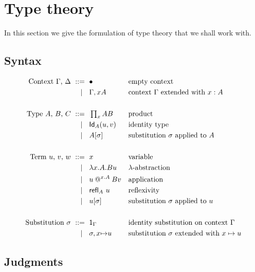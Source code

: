 \section{Type theory}
\label{sec:type-theory}

In this section we give the formulation of type theory that we shall work with.

\subsection{Syntax}
\label{sec:syntax}

\begin{align*}
  \text{Context $\Gamma$, $\Delta$}
    \ \mathrel{{:}{:}{=}}\    {}& \bullet                  && \text{empty context} \\
    \ \mid\ \  {}& \Gamma, x{A}     && \text{context $\Gamma$ extended with $x : A$} \\
  \\
  \text{Type $A$, $B$, $C$}
    \ \mathrel{{:}{:}{=}}\    {}& \mathop{\textstyle\prod_{x}}{A} B            && \text{product}\\
    \ \mid\ \  {}& \mathsf{Id}_{A}(u,v)          && \text{identity type} \\
    \ \mid\ \  {}& A[\sigma]           && \text{substitution $\sigma$ applied to $A$} \\
  \\
  \text{Term $u$, $v$, $w$}
    \ \mathrel{{:}{:}{=}}\    {}& x                         && \text{variable} \\
    \ \mid\ \  {}& \lambda x . A .{B} u       && \text{$\lambda$-abstraction} \\
    \ \mid\ \  {}& u\mathbin{@^{x.A}} B{v} && \text{application} \\
    \ \mid\ \  {}& {\mathsf{refl}_{A}}\  u              && \text{reflexivity} \\
    \ \mid\ \  {}& u[\sigma]          && \text{substitution $\sigma$ applied to $u$} \\
  \\
  \text{Substitution $\sigma$}
    \ \mathrel{{:}{:}{=}}\    {}& \mathsf{1}_{\Gamma}            && \text{identity substitution on context $\Gamma$} \\
    \ \mid\ \  {}& \sigma,x{\mapsto}u   && \text{substitution $\sigma$ extended with $x \mapsto u$}
\end{align*}


\subsection{Judgments}
\label{sec:judgments}


